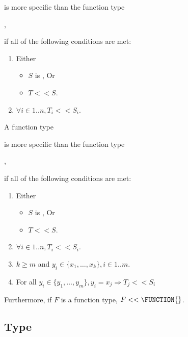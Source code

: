 \documentclass{article}
\begin{document}
\noindent
is more specific than the function type


,

\noindent
if all of the following conditions are met:
\begin{enumerate}
\item Either
\begin{itemize}
\item $S$ is \VOID{}, Or
\item $T << S$.
\end{itemize}
\item $\forall i \in 1 .. n, T_i << S_i$.
\end{enumerate}

\LMHash{}
A function type



\noindent
is more specific than the function type


,

\noindent
if all of the following conditions are met:
\begin{enumerate}
\item Either
\begin{itemize}
\item $S$ is \VOID{}, Or
\item $T << S$.
\end{itemize}
\item $\forall i \in 1 .. n, T_i << S_i$.
\item $k \ge m$ and $y_i \in \{x_1, \ldots, x_k\}, i \in 1 .. m$.
\item For all $y_i \in \{y_1, \ldots, y_m\}, y_i = x_j \Rightarrow T_j << S_i$
\end{enumerate}

\LMHash{}
Furthermore, if $F$ is a function type, $F << \FUNCTION{}$.


\subsection{Type \DYNAMIC{}}
\end{document}
